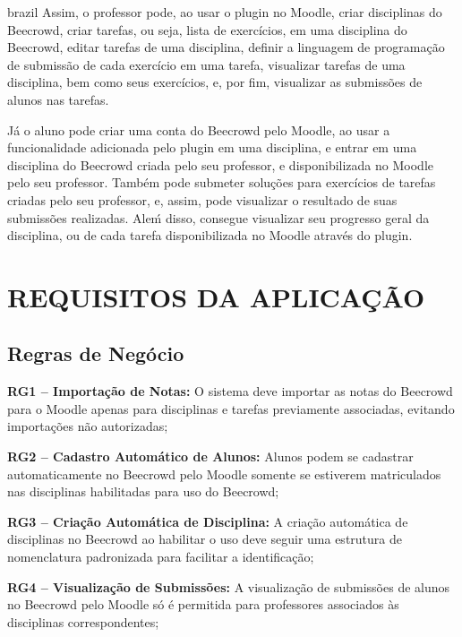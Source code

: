 \begin{otherlanguage*}{brazil}
Assim, o professor pode, ao usar o plugin no Moodle, criar disciplinas do Beecrowd, criar tarefas, ou seja, lista de exercícios, em uma disciplina do Beecrowd, editar tarefas de uma disciplina, definir a linguagem de programação de submissão de cada exercício em uma tarefa, visualizar tarefas de uma disciplina, bem como seus exercícios, e, por fim, visualizar as submissões de alunos nas tarefas. 

Já o aluno pode criar uma conta do Beecrowd pelo Moodle, ao usar a funcionalidade adicionada pelo plugin em uma disciplina, e entrar em uma disciplina do Beecrowd criada pelo seu professor, e disponibilizada no Moodle pelo seu professor. Também pode submeter soluções para exercícios de tarefas criadas pelo seu professor, e, assim, pode visualizar o resultado de suas submissões realizadas. Aleḿ disso, consegue visualizar seu progresso geral da disciplina, ou de cada tarefa disponibilizada no Moodle através do plugin.

\section{REQUISITOS DA APLICAÇÃO}

\subsection{Regras de Negócio}

\textbf{RG1 – Importação de Notas:} O sistema deve importar as notas do Beecrowd para o Moodle apenas para disciplinas e tarefas previamente associadas, evitando importações não autorizadas;

\vspace{12pt}

\textbf{RG2 – Cadastro Automático de Alunos:} Alunos podem se cadastrar automaticamente no Beecrowd pelo Moodle somente se estiverem matriculados nas disciplinas habilitadas para uso do Beecrowd;

\vspace{12pt}

\textbf{RG3 – Criação Automática de Disciplina:} A criação automática de disciplinas no Beecrowd ao habilitar o uso deve seguir uma estrutura de nomenclatura padronizada para facilitar a identificação;

\vspace{12pt}

\textbf{RG4 – Visualização de Submissões:} A visualização de submissões de alunos no Beecrowd pelo Moodle só é permitida para professores associados às disciplinas correspondentes;


\end{otherlanguage*}
